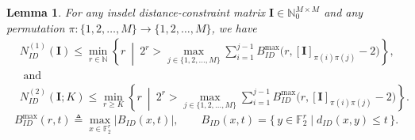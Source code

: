 \documentclass[11 pt]{article}
\numberwithin{equation}{section}
\newtheorem{lemma}[theorem]{Lemma}
\begin{document}
    \begin{lemma}\label{Lemma Gv}
        For any insdel distance-constraint matrix \( \mathbf{I} \in \mathbb{N}^{M\times M}_0 \) and any permutation 
        \( \pi : \{1, 2, \ldots, M\} \rightarrow \{1, 2, \ldots, M\} \), we have
        \begin{align*}
         &N^{(1)}_{ID}(\boldsymbol{I}) \leq \min_{r \in \mathbb{N}} \left\{ r \ \middle|\ 2^r > \max_{j \in \{1, 2, \ldots, M\}} \sum_{i=1}^{j-1} B^{\max}_{ID}\big(r,[\boldsymbol{I}]_{\pi(i)\pi(j)} - 2\big) \right\},\\       &\text{ and } \\&N^{(2)}_{ID}(\boldsymbol{I};K) \leq \min_{r \geq K} \left\{ r \ \middle|\ 2^r > \max_{j \in \{1, 2, \ldots, M\}} \sum_{i=1}^{j-1} B^{\max}_{ID}\big(r,[\boldsymbol{I}]_{\pi(i)\pi(j)} - 2\big) \right\}.  
        \end{align*}
        \[
            B^{\max}_{ID}(r,t)
            \triangleq
            \max_{x \in \mathbb{F}_2^r}
            \left| B_{ID}(x,t) \right|,
            \qquad
            B_{ID}(x,t) = \{\, y \in \mathbb{F}_2^r \mid d_{ID}(x,y) \le t \,\}.
        \]
    \end{lemma}
\end{document}
